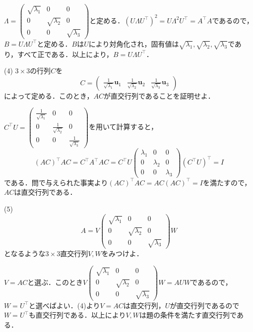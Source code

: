 \documentclass[a4j]{jarticle}
\begin{document}
$\Lambda=\begin{pmatrix}
\sqrt{\lambda_1}& 0&  0\\
0&  \sqrt{\lambda_2}& 0\\
0& 0&  \sqrt{\lambda_3}
\end{pmatrix}$と定める．$(U\Lambda U^\top)^2=U\Lambda^2 U^\top=A^\top A$であるので，$B=U\Lambda U^\top$と定める．$B$は$U$により対角化され，固有値は$\sqrt{\lambda_1},\sqrt{\lambda_2},\sqrt{\lambda_3}$であり，すべて正である．以上により，$B=U\Lambda U^\top$．
\begin{screen}
(4)
$3 \times 3$の行列$C$を
$$ C=\begin{pmatrix}
\frac{1}{\sqrt{\lambda_1}}\bm{u}_1 & \frac{1}{\sqrt{\lambda_2}}\bm{u}_2 & \frac{1}{\sqrt{\lambda_3}}\bm{u}_3 
\end{pmatrix}$$
によって定める．このとき，$AC$が直交行列であることを証明せよ．
\end{screen}

$C^\top U = \begin{pmatrix}
\frac{1}{\sqrt{\lambda_1}}& 0&  0\\
0&  \frac{1}{\sqrt{\lambda_2}}& 0\\
0& 0&  \frac{1}{\sqrt{\lambda_3}}
\end{pmatrix}$を用いて計算すると，
$$(AC)^\top AC = C^\top A^\top AC =C^\top U
\begin{pmatrix}
\lambda_1& 0&  0\\
0&  \lambda_2& 0\\
0& 0&  \lambda_3
\end{pmatrix}
(C^\top U)^\top=I$$である．問で与えられた事実より$(AC)^\top AC=AC(AC)^\top=I$を満たすので，$AC$は直交行列である．
\begin{screen}
(5)
$$A=V\begin{pmatrix}
\sqrt{\lambda_1}& 0&  0\\
0&  \sqrt{\lambda_2}& 0\\
0& 0&  \sqrt{\lambda_3}
\end{pmatrix}W$$
となるような$3 \times 3$直交行列$V,W$をみつけよ．
\end{screen}


$V=AC$と選ぶ．このとき$V\begin{pmatrix}
\sqrt{\lambda_1}& 0&  0\\
0&  \sqrt{\lambda_2}& 0\\
0& 0&  \sqrt{\lambda_3}
\end{pmatrix}W=AUW$であるので，$W=U^\top$と選べばよい．(4)より$V=AC$は直交行列，$U$が直交行列であるので$W=U^\top$も直交行列である．以上により$V,W$は題の条件を満たす直交行列である．
\end{document}
